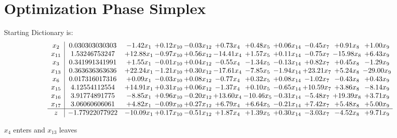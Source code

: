 \documentclass[9pt]{article}
\begin{document}
\section{Optimization Phase Simplex}
Starting Dictionary is:
\[\begin{array}{c| c c@{\hskip 2pt} c@{\hskip 2pt} c@{\hskip 2pt} c@{\hskip 2pt} c@{\hskip 2pt} c@{\hskip 2pt} c@{\hskip 2pt} c@{\hskip 2pt} c@{\hskip 2pt} }
 x_{2}   &  0.030303030303 & -1.42 x_{1} & +  0.12 x_{10} & -0.03 x_{12} & +  0.73 x_{4} & +  0.48 x_{5} & +  0.06 x_{14} & -0.45 x_{7} & +  0.91 x_{8} & +  1.00 x_{9}\\
 x_{11}   &  1.53246753247 & + 12.88 x_{1} & -0.97 x_{10} & +  0.56 x_{12} & -14.41 x_{4} & +  1.57 x_{5} & +  0.11 x_{14} & -0.75 x_{7} & -15.98 x_{8} & +  6.43 x_{9}\\
 x_{3}   &  0.341991341991 & +  1.55 x_{1} & -0.01 x_{10} & +  0.04 x_{12} & -0.55 x_{4} & -1.34 x_{5} & -0.13 x_{14} & +  0.82 x_{7} & +  0.45 x_{8} & -1.29 x_{9}\\
 x_{13}   &  0.363636363636 & + 22.24 x_{1} & -1.21 x_{10} & +  0.30 x_{12} & -17.61 x_{4} & -7.85 x_{5} & -1.94 x_{14} & + 23.21 x_{7} & +  5.24 x_{8} & -29.00 x_{9}\\
 x_{6}   &  0.017316017316 & +  0.09 x_{1} & -0.03 x_{10} & +  0.08 x_{12} & -0.77 x_{4} & +  0.32 x_{5} & +  0.08 x_{14} & -1.02 x_{7} & -0.43 x_{8} & +  0.43 x_{9}\\
 x_{15}   &  4.12554112554 & + 14.91 x_{1} & +  0.31 x_{10} & +  0.06 x_{12} & -1.37 x_{4} & +  0.10 x_{5} & -0.65 x_{14} & + 10.59 x_{7} & +  3.86 x_{8} & -8.14 x_{9}\\
 x_{16}   &  3.91774891775 & -8.85 x_{1} & +  0.96 x_{10} & -0.20 x_{12} & + 13.60 x_{4} & -10.46 x_{5} & -0.31 x_{14} & -5.48 x_{7} & + 19.39 x_{8} & +  3.71 x_{9}\\
 x_{17}   &  3.06060606061 & +  4.82 x_{1} & -0.09 x_{10} & +  0.27 x_{12} & +  6.79 x_{4} & +  6.64 x_{5} & -0.21 x_{14} & +  7.42 x_{7} & +  5.48 x_{8} & +  5.00 x_{9}\\
\hline
z    &  -1.77922077922 & -10.09 x_{1} & +  0.17 x_{10} & -0.51 x_{12} & +  1.87 x_{4} & +  1.39 x_{5} & +  0.30 x_{14} & -3.03 x_{7} & -4.52 x_{8} & +  9.71 x_{9}\\
\end{array}\]


 $ x_{4} $ enters and $ x_{13} $ leaves 
\end{document}
